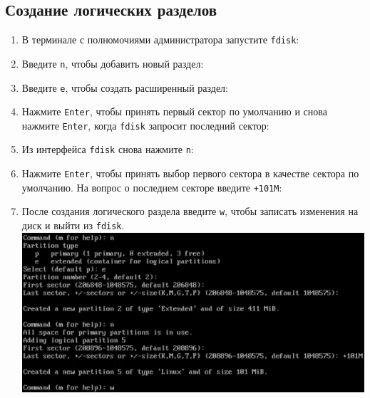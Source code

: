 \documentclass[12pt]{article}
\begin{document}
\subsection{Создание логических разделов}
\begin{enumerate}
	\item В терминале с полномочиями администратора запустите \texttt{fdisk}:
	\item Введите \texttt{n}, чтобы добавить новый раздел:
	\item Введите \texttt{e}, чтобы создать расширенный раздел:
	\item Нажмите \texttt{Enter}, чтобы принять первый сектор по умолчанию и снова нажмите \texttt{Enter}, когда \texttt{fdisk} запросит последний сектор:
	\item Из интерфейса \texttt{fdisk} снова нажмите \texttt{n}:
	\item Нажмите \texttt{Enter}, чтобы принять выбор первого сектора в качестве сектора по умолчанию. На вопрос о последнем секторе введите \texttt{+101M}:
	\item После создания логического раздела введите \texttt{w}, чтобы записать изменения на диск и выйти из \texttt{fdisk}.
	      \\\includegraphics{3.png}
\end{enumerate}
\end{document}
